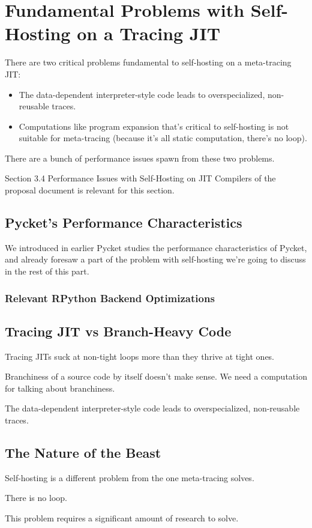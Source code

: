 \chapter{Fundamental Problems with Self-Hosting on a Tracing JIT}

	\begin{chapterpoint}
		There are two critical problems fundamental to self-hosting on a meta-tracing JIT:
		\begin{itemize}
			\item The data-dependent interpreter-style code leads to overspecialized, non-reusable traces.
			\item Computations like program expansion that's critical to self-hosting is not suitable for meta-tracing (because it's all static computation, there's no loop).
		\end{itemize}
		There are a bunch of performance issues spawn from these two problems.
	\end{chapterpoint}

	\begin{todo}[Import]
			Section 3.4 Performance Issues with Self-Hosting on JIT Compilers of the proposal document is relevant for this section.
	\end{todo}

	\section{Pycket's Performance Characteristics}
        \begin{mainpoint}
            We introduced in earlier Pycket studies the performance characteristics of Pycket, and already foresaw a part of the problem with self-hosting we're going to discuss in the rest of this part.
        \end{mainpoint}

        \subsection{Relevant RPython Backend Optimizations}

	\section{Tracing JIT vs Branch-Heavy Code}
		\begin{mainpoint}
		 	Tracing JITs suck at non-tight loops more than they thrive at tight ones.

			Branchiness of a source code by itself doesn't make sense. We need a computation for talking about branchiness.

			The data-dependent interpreter-style code leads to overspecialized, non-reusable traces.
		\end{mainpoint}

	\section{The Nature of the Beast}
		\begin{mainpoint}
			Self-hosting is a different problem from the one meta-tracing solves.

			There is no loop.

			This problem requires a significant amount of research to solve.
		\end{mainpoint}
